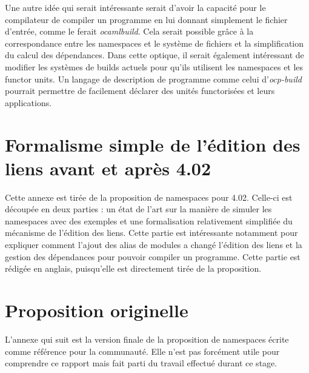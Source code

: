 \documentclass[11pt,a4paper]{report}
\begin{document}
Une autre idée qui serait intéressante serait d'avoir la capacité pour le
compilateur de compiler un programme en lui donnant simplement le fichier
d'entrée, comme le ferait \emph{ocamlbuild}. Cela serait possible grâce à la
correspondance entre les namespaces et le système de fichiers et la
simplification du calcul des dépendances. Dans cette optique, il serait
également intéressant de modifier les systèmes de builds actuels pour qu'ils
utilisent les namespaces et les functor units. Un langage de description de
programme comme celui d'\emph{ocp-build} pourrait permettre de facilement
déclarer des unités functorisées et leurs applications.




\appendix

\chapter{Formalisme simple de l'édition des liens avant et après 4.02}

Cette annexe est tirée de la proposition de namespaces pour 4.02. Celle-ci est
découpée en deux parties : un état de l'art sur la manière de simuler les
namespaces avec des exemples et une formalisation relativement simplifiée du
mécanisme de l'édition des liens. Cette partie est intéressante notamment pour
expliquer comment l'ajout des alias de modules a changé l'édition des liens et
la gestion des dépendances pour pouvoir compiler un programme. Cette partie est
rédigée en anglais, puisqu'elle est directement tirée de la proposition.




\chapter{Proposition originelle}

L'annexe qui suit est la version finale de la proposition de namespaces écrite
comme référence pour la communauté. Elle n'est pas forcément utile pour
comprendre ce rapport mais fait parti du travail effectué durant ce stage.


\end{document}
